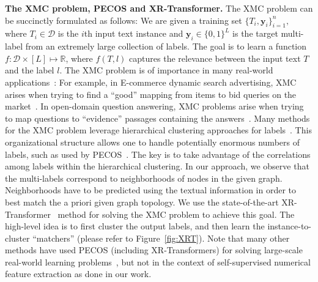 \documentclass{article} %
\begin{document}
\textbf{The XMC problem, PECOS and XR-Transformer.} 
The XMC problem can be succinctly formulated as follows: We are given a training set $\{T_i,\mathbf{y}_i\}_{i=1}^n,$ where $T_i\in \mathcal{D}$ is the $i$th input text instance and $\mathbf{y}_i \in \{0,1\}^L$ is the target multi-label from an extremely large collection of labels. The goal is to learn a function $f: \mathcal{D}\times [L] \mapsto \mathbb{R}$, where $f(T,l)$ captures the relevance between the input text $T$ and the label $l$. The XMC problem is of importance in many real-world applications~\citep{jiang2021lightxml,ye2020pretrained}: For example, in E-commerce dynamic search advertising, XMC arises when trying to find a ``good'' mapping from items to bid queries on the market~\citep{prabhu2018parabel,prabhu2014fastxml}. In open-domain question answering, XMC problems arise when trying to map questions to ``evidence'' passages containing the answers~\citep{chang2020pretraining,lee2019latent}. Many methods for the XMC problem leverage hierarchical clustering approaches for labels~\citep{prabhu2018parabel,you2019attentionxml}. This organizational structure allows one to handle potentially enormous numbers of labels, such as used by PECOS~\citep{yu2020pecos}. The key is to take advantage of the correlations among labels within the hierarchical clustering. 
In our approach, we observe that the multi-labels correspond to neighborhoods of nodes in the given graph. Neighborhoods have to be predicted using the textual information in order to best match the a priori given graph topology. We use the state-of-the-art XR-Transformer~\citep{jiong2021fast} method for solving the XMC problem to achieve this goal. The high-level idea is to first cluster the output labels, and then learn the instance-to-cluster ``matchers'' (please refer to Figure~\ref{fig:XRT}). Note that many other methods have used PECOS (including XR-Transformers) for solving large-scale real-world learning problems~\citep{etter2021accelerating,liu2021label,chang2020taming,baharav2021enabling,chang2021extreme,yadav2021session,sen2021top}, but not in the context of self-supervised numerical feature extraction as done in our work. 
\end{document}
